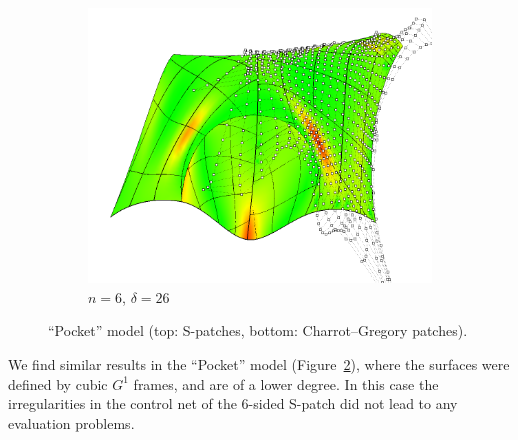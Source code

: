 \documentclass[9pt,academicons]{article}
\begin{document}
\begin{figure}[!ht]
\begin{subfigure}{.33\textwidth}
    \includegraphics[width=\textwidth]{images/pocket/cg1.png}
    \caption{$n=6$, $\delta=26$}
    \label{fig:pocket-6-cg}
  \end{subfigure}
  \caption{``Pocket'' model (top: S-patches, bottom: Charrot--Gregory patches).}
  \label{fig:pocket}
\end{figure}

We find similar results in the ``Pocket'' model (Figure~\ref{fig:pocket}),
where the surfaces were defined by cubic $G^1$ frames, and are of a lower degree.
In this case the irregularities in the control net of the 6-sided S-patch
did not lead to any evaluation problems.
\end{document}
